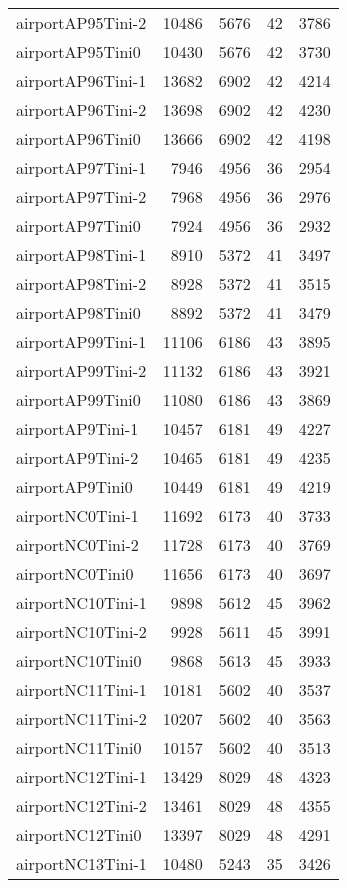 \begin{longtable}{lrrrr}
airportAP95Tini-2 & 10486 & 5676 & 42 & 3786 \\
airportAP95Tini0 & 10430 & 5676 & 42 & 3730 \\
airportAP96Tini-1 & 13682 & 6902 & 42 & 4214 \\
airportAP96Tini-2 & 13698 & 6902 & 42 & 4230 \\
airportAP96Tini0 & 13666 & 6902 & 42 & 4198 \\
airportAP97Tini-1 & 7946 & 4956 & 36 & 2954 \\
airportAP97Tini-2 & 7968 & 4956 & 36 & 2976 \\
airportAP97Tini0 & 7924 & 4956 & 36 & 2932 \\
airportAP98Tini-1 & 8910 & 5372 & 41 & 3497 \\
airportAP98Tini-2 & 8928 & 5372 & 41 & 3515 \\
airportAP98Tini0 & 8892 & 5372 & 41 & 3479 \\
airportAP99Tini-1 & 11106 & 6186 & 43 & 3895 \\
airportAP99Tini-2 & 11132 & 6186 & 43 & 3921 \\
airportAP99Tini0 & 11080 & 6186 & 43 & 3869 \\
airportAP9Tini-1 & 10457 & 6181 & 49 & 4227 \\
airportAP9Tini-2 & 10465 & 6181 & 49 & 4235 \\
airportAP9Tini0 & 10449 & 6181 & 49 & 4219 \\
airportNC0Tini-1 & 11692 & 6173 & 40 & 3733 \\
airportNC0Tini-2 & 11728 & 6173 & 40 & 3769 \\
airportNC0Tini0 & 11656 & 6173 & 40 & 3697 \\
airportNC10Tini-1 & 9898 & 5612 & 45 & 3962 \\
airportNC10Tini-2 & 9928 & 5611 & 45 & 3991 \\
airportNC10Tini0 & 9868 & 5613 & 45 & 3933 \\
airportNC11Tini-1 & 10181 & 5602 & 40 & 3537 \\
airportNC11Tini-2 & 10207 & 5602 & 40 & 3563 \\
airportNC11Tini0 & 10157 & 5602 & 40 & 3513 \\
airportNC12Tini-1 & 13429 & 8029 & 48 & 4323 \\
airportNC12Tini-2 & 13461 & 8029 & 48 & 4355 \\
airportNC12Tini0 & 13397 & 8029 & 48 & 4291 \\
airportNC13Tini-1 & 10480 & 5243 & 35 & 3426 \\

\end{longtable}
